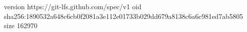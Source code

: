version https://git-lfs.github.com/spec/v1
oid sha256:1890532a648c6cb0f2081a3e112e01733b029dd679a8138c6a6c981ed7ab5805
size 162970
